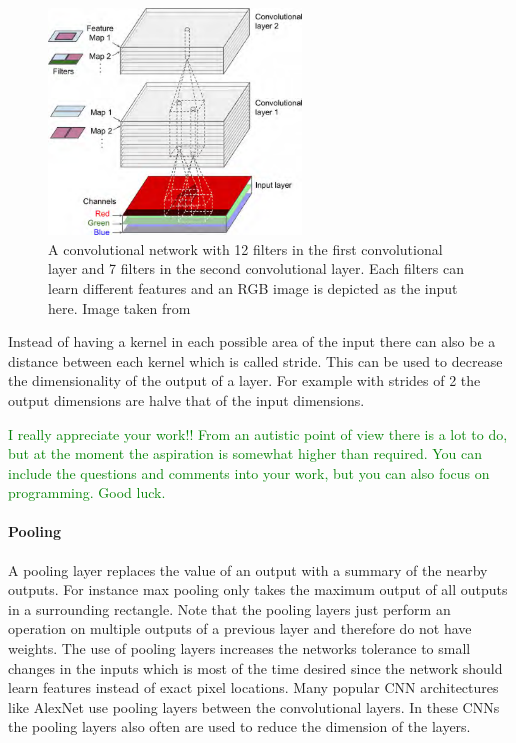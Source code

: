 \begin{figure}[h]
    \centering
    \includegraphics[width=0.6\textwidth]{images/figures/convolutional_net_multiple_filters.png}
    \caption{A convolutional network with 12 filters in the first convolutional layer and 7
    filters in the second convolutional layer. Each filters can learn different features and an
    RGB image is depicted as the input here.
    Image taken from \parencite{2017-geron-homl}} \label{figure_cnn_filter}
\end{figure}

Instead of having a kernel in each possible area of the input there can also be a distance between
each kernel which is called stride. This can be used to decrease the dimensionality of the output
of a layer. For example with strides of 2 the output dimensions are halve that of the input
dimensions.

\textcolor{green}{I really appreciate your work!! From an autistic point of view there is a lot to do, but at the moment the aspiration is somewhat higher than required. You can include the questions and comments into your work, but you can also focus on programming. Good luck.}

\paragraph{Pooling}
A pooling layer replaces the value of an output with a summary of the nearby outputs. For instance
max pooling only takes the maximum output of all outputs in a surrounding rectangle. Note that
the pooling layers just perform an operation on multiple outputs of a previous layer and therefore
do not have weights. The use of pooling layers increases the networks tolerance to small changes in
the inputs \parencite{2016-goodfellow-deep} which is most of the time desired since the network should
learn features instead of exact pixel locations. Many popular CNN architectures like 
AlexNet \parencite{2012-krizhevsky-imagenet} use pooling layers between the convolutional layers.
In these CNNs the pooling layers also often are used to reduce the dimension of the layers.


